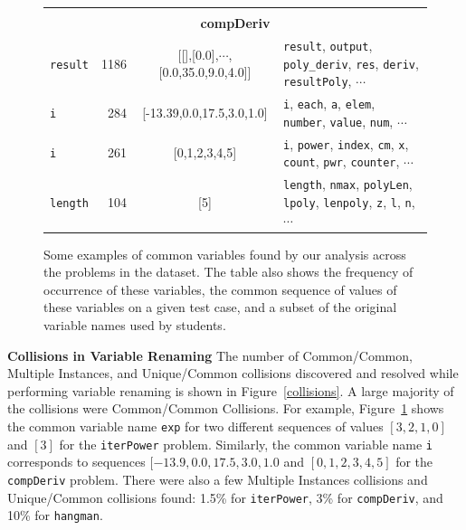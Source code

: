 \documentclass[12pt,twoside]{mitthesis}
\newcommand \codevar[1]{\texttt{#1}}
\begin{document}
{{{{{{{{{{\begin{figure}
\begin{tabular} {|l|r|c|l|}
\multicolumn{4}{|c|}{}\\
\multicolumn{4}{|c|}{\bf compDeriv}\\ \hline
\codevar{result} & 1186 & [[],[0.0],$\cdots$,[0.0,35.0,9.0,4.0]] & \codevar{result}, \codevar{output}, \codevar{poly\_deriv}, \codevar{res}, \codevar{deriv}, \codevar{resultPoly}, $\cdots$\\ \hline
\codevar{i} & 284 &  [-13.39,0.0,17.5,3.0,1.0] & \codevar{i}, \codevar{each}, \codevar{a}, \codevar{elem}, \codevar{number}, \codevar{value}, \codevar{num}, $\cdots$\\ \hline
\codevar{i} & 261 & [0,1,2,3,4,5] & \codevar{i}, \codevar{power}, \codevar{index}, \codevar{cm}, \codevar{x}, \codevar{count}, \codevar{pwr}, \codevar{counter}, $\cdots$\\ \hline
\codevar{length} & 104 & [5] & \codevar{length}, \codevar{nmax}, \codevar{polyLen}, \codevar{lpoly}, \codevar{lenpoly}, \codevar{z}, \codevar{l}, \codevar{n}, $\cdots$\\ \hline

\end{tabular}
\caption{Some examples of common variables found by our analysis across the problems in the dataset. The table also shows the frequency of occurrence of these variables, the common sequence of values of these variables on a given test case, and a subset of the original variable names used by students.}
\label{examplecommonvars}
\end{figure}

{\bf Collisions in Variable Renaming} The number of Common/Common, Multiple Instances, and Unique/Common collisions discovered and resolved while performing variable renaming is shown in Figure~\ref{collisions}. A large majority of the collisions were Common/Common Collisions. For example, Figure~\ref{examplecommonvars} shows the common variable name \codevar{exp} for two different sequences of values $[3,2,1,0]$ and $[3]$ for the \codevar{iterPower} problem. Similarly, the common variable name \codevar{i} corresponds to sequences $[-13.9, 0.0, 17.5, 3.0, 1.0$ and $[0, 1, 2, 3, 4, 5]$ for the \codevar{compDeriv} problem. There were also a few Multiple Instances collisions and Unique/Common collisions found: 1.5\% for \codevar{iterPower}, 3\% for \codevar{compDeriv}, and 10\% for \codevar{hangman}.

}}}}}}}}}}
\end{document}
